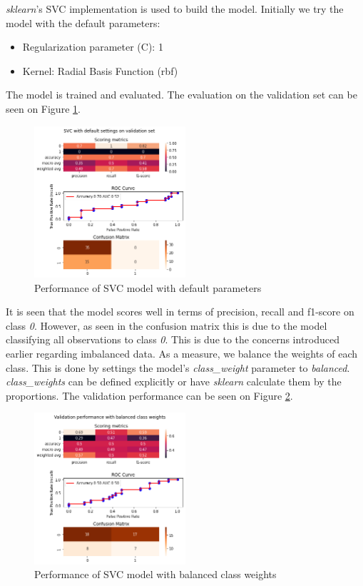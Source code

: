 \textit{sklearn}'s SVC implementation is used to build the model. Initially we try the model with the default parameters: 
\begin{itemize}
  \item Regularization parameter (C): 1
  \item Kernel: Radial Basis Function (rbf)
\end{itemize}

\noindent The model is trained and evaluated. The evaluation on the validation set can be seen on Figure \ref{fig:results_default}.

\begin{figure}[htbp!]
  \centering
  \includegraphics[width=0.5\textwidth]{../project/images/results_default-svc.png}
  \caption{Performance of SVC model with default parameters}
  \label{fig:results_default}
\end{figure}
It is seen that the model scores well in terms of precision, recall and f1-score on class \textit{0}. However, as seen in the confusion matrix this is due to the model classifying all observations to class \textit{0}. This is due to the concerns introduced earlier regarding imbalanced data. As a measure, we balance the weights of each class. This is done by settings the model's \textit{class\_weight} parameter to \textit{balanced}. \textit{class\_weights} can be defined explicitly or have \textit{sklearn} calculate them by the proportions. The validation performance can be seen on Figure \ref{fig:results_default_balanced}.

\begin{figure}[htbp!]
  \centering
  \includegraphics[width=0.5\textwidth]{../project/images/results_default_balanced-svc.png}
  \caption{Performance of SVC model with balanced class weights}
  \label{fig:results_default_balanced}
\end{figure}

